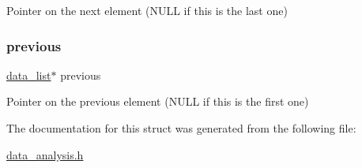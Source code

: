 Pointer on the next element (N\+U\+LL if this is the last one) \mbox{\label{structdata__list__st_a23f1012db1e6eb88a69e28cf0b419422}} 
\subsubsection{\texorpdfstring{previous}{previous}}
{\footnotesize\ttfamily \mbox{\hyperlink{data__analysis_8h_a9db432fc1185a85fe322653c4d3f54d5}{data\+\_\+list}}$\ast$ previous}

Pointer on the previous element (N\+U\+LL if this is the first one) 

The documentation for this struct was generated from the following file\+:\begin{DoxyCompactItemize}
\item 
\mbox{\hyperlink{data__analysis_8h}{data\+\_\+analysis.\+h}}\end{DoxyCompactItemize}
